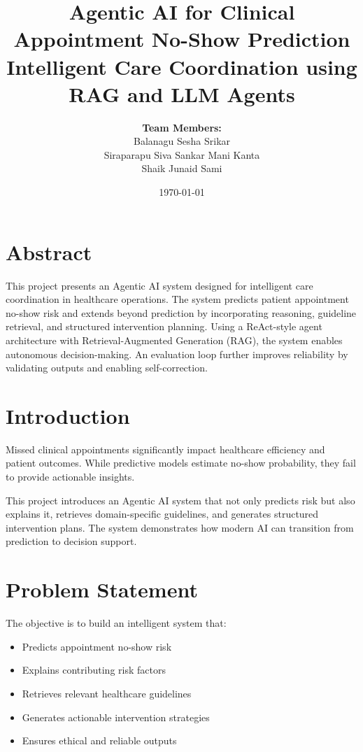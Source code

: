 \documentclass[12pt]{article}
\title{\textbf{Agentic AI for Clinical Appointment No-Show Prediction}\\
\vspace{0.3cm}
\large Intelligent Care Coordination using RAG and LLM Agents}
\author{
\textbf{Team Members:} \\
Balanagu Sesha Srikar \\
Siraparapu Siva Sankar Mani Kanta \\
Shaik Junaid Sami
}
\date{\today}
\begin{document}
\maketitle
\onehalfspacing


\section{Abstract}
This project presents an Agentic AI system designed for intelligent care coordination in healthcare operations. The system predicts patient appointment no-show risk and extends beyond prediction by incorporating reasoning, guideline retrieval, and structured intervention planning. Using a ReAct-style agent architecture with Retrieval-Augmented Generation (RAG), the system enables autonomous decision-making. An evaluation loop further improves reliability by validating outputs and enabling self-correction.


\section{Introduction}
Missed clinical appointments significantly impact healthcare efficiency and patient outcomes. While predictive models estimate no-show probability, they fail to provide actionable insights.

This project introduces an Agentic AI system that not only predicts risk but also explains it, retrieves domain-specific guidelines, and generates structured intervention plans. The system demonstrates how modern AI can transition from prediction to decision support.


\section{Problem Statement}
The objective is to build an intelligent system that:
\begin{itemize}
    \item Predicts appointment no-show risk
    \item Explains contributing risk factors
    \item Retrieves relevant healthcare guidelines
    \item Generates actionable intervention strategies
    \item Ensures ethical and reliable outputs
\end{itemize}
\end{document}
